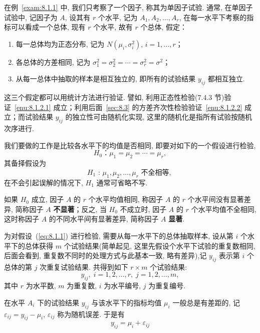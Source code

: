 在例~\ref{exam:8.1.1} 中, 我们只考察了一个因子, 称其为单因子试验. 通常, 在单因子试验中, 记因子为 $A$, 设其有 $r$ 个水平, 记为 $A_1,A_2,\ldots,A_r$, 在每一水平下考察的指标可以看成一个总体, 现有 $r$ 个水平, 故有 $r$ 个总体, 假定：

\begin{enumerate}
  \item 每一总体均为正态分布, 记为 $N(\mu_i, \sigma_i^2)$, $i=1,\ldots,r$；\label{enu:8.1.2.1}
  \item 各总体的方差相同, 记为 $\sigma_1^2 = \sigma_2^2=\cdots=\sigma_r^2=\sigma^2$；\label{enu:8.1.2.2}
  \item 从每一总体中抽取的样本是相互独立的, 即所有的试验结果 $y_{ij}$ 都相互独立. 
\end{enumerate}

这三个假定都可以用统计方法进行验证. 譬如, 利用正态性检验(7.4.3 节)验证~\ref{enu:8.1.2.1} 成立；利用后面~\ref{sec:8.3} 的方差齐次性检验验证~\ref{enu:8.1.2.2} 成立；而试验结果 $y_{ij}$ 的独立性可由随机化实现, 这里的随机化是指所有试验按随机次序进行. 

我们要做的工作是比较各水平下的均值是否相同, 即要对如下的一个假设进行检验, 
\begin{equation}
  H_0 \text{：} \mu_1 = \mu_2 = \cdots = \mu_r,\label{eq:8.1.1}
\end{equation}
其备择假设为
\begin{equation*}
  H_1 \text{ : } \mu_1,\mu_2,\ldots,\mu_r \text{ 不全相等, }
\end{equation*}
在不会引起误解的情况下, $H_1$ 通常可省略不写. 

如果 $H_0$ 成立, 因子 $A$ 的 $r$ 个水平均值相同, 称因子 $A$ 的 $r$ 个水平间没有显著差异, 简称因子 $A$ \textbf{不显著}；反之, 当 $H_0$ 不成立时, 因子 $A$ 的 $r$ 个水平均值不全相同, 这时称因子 $A$ 的不同水平间有显著差异, 简称因子 $A$ \textbf{显著}. 

为对假设~(\ref{eq:8.1.1}) 进行检验, 需要从每一水平下的总体抽取样本, 设从第 $i$ 个水平下的总体获得 $m$ 个试验结果(简单起见, 这里先假设个水平下试验的重复数相同, 后面会看到, 重复数不同时的处理方式与此基本一致, 略有差异),记 $y_{ij}$ 表示第 $i$ 个总体的第 $j$ 次重复试验结果. 共得到如下 $r \times m$ 个试验结果:
\begin{equation*}
  y_{ij}, \; i=1,2,\ldots,r, \; j = 1,2,\ldots,m,
\end{equation*}
其中 $r$ 为水平数, $m$ 为重复数, $i$ 为水平编号, $j$ 为重复编号.

在水平 $A_i$ 下的试验结果 $y_{ij}$ 与该水平下的指标均值 $\mu_i$ 一般总是有差距的, 记 $\varepsilon_{ij} = y_{ij} - \mu_i$, $\varepsilon_{ij}$ 称为随机误差. 于是有
\begin{equation}
  \label{eq:8.1.2}
  y_{ij} = \mu_i + \varepsilon_{ij}
\end{equation}

